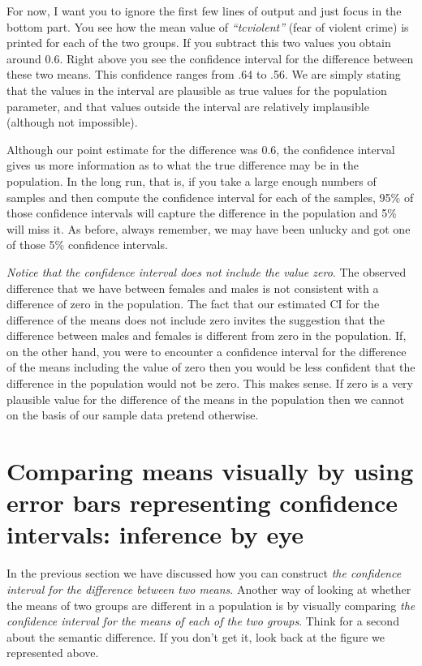 \documentclass[
]{book}
\begin{document}
For now, I want you to ignore the first few lines of output and just focus in the bottom part. You see how the mean value of \emph{``tcviolent''} (fear of violent crime) is printed for each of the two groups. If you subtract this two values you obtain around 0.6. Right above you see the confidence interval for the difference between these two means. This confidence ranges from .64 to .56. We are simply stating that the values in the interval are plausible as true values for the population parameter, and that values outside the interval are relatively implausible (although not impossible).

Although our point estimate for the difference was 0.6, the confidence interval gives us more information as to what the true difference may be in the population. In the long run, that is, if you take a large enough numbers of samples and then compute the confidence interval for each of the samples, 95\% of those confidence intervals will capture the difference in the population and 5\% will miss it. As before, always remember, we may have been unlucky and got one of those 5\% confidence intervals.

\emph{Notice that the confidence interval does not include the value zero}. The observed difference that we have between females and males is not consistent with a difference of zero in the population. The fact that our estimated CI for the difference of the means does not include zero invites the suggestion that the difference between males and females is different from zero in the population. If, on the other hand, you were to encounter a confidence interval for the difference of the means including the value of zero then you would be less confident that the difference in the population would not be zero. This makes sense. If zero is a very plausible value for the difference of the means in the population then we cannot on the basis of our sample data pretend otherwise.

\hypertarget{comparing-means-visually-by-using-error-bars-representing-confidence-intervals-inference-by-eye}{%
\section{Comparing means visually by using error bars representing confidence intervals: inference by eye}\label{comparing-means-visually-by-using-error-bars-representing-confidence-intervals-inference-by-eye}}

In the previous section we have discussed how you can construct \emph{the confidence interval for the difference between two means}. Another way of looking at whether the means of two groups are different in a population is by visually comparing \emph{the confidence interval for the means of each of the two groups}. Think for a second about the semantic difference. If you don't get it, look back at the figure we represented above.
\end{document}
